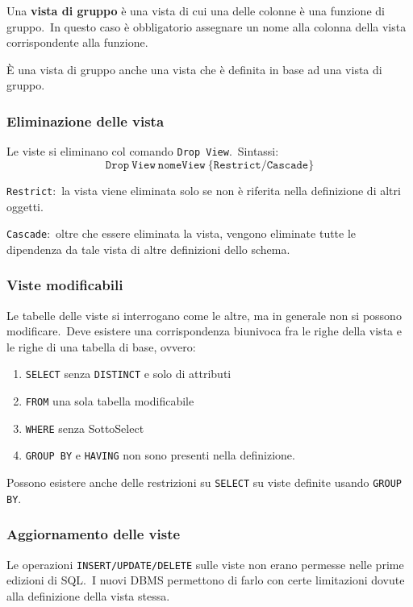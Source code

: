 Una \textbf{vista di gruppo} è una vista di cui una delle colonne è una funzione di gruppo.\
In questo caso è obbligatorio assegnare un nome alla colonna della vista corrispondente alla funzione.\

È una vista di gruppo anche una vista che è definita in base ad una vista di gruppo.

\subsubsection{Eliminazione delle vista}

Le viste si eliminano col comando \texttt{Drop View}.\
Sintassi:
\[\mathtt{Drop\ View\ nomeView\ \{Restrict/Cascade\}}\]

\noindent\texttt{Restrict}:\ la vista viene eliminata solo se non è riferita nella definizione di altri oggetti.

\noindent\texttt{Cascade}:\ oltre che essere eliminata la vista, vengono eliminate tutte le dipendenza da tale vista di altre definizioni dello schema.

\subsubsection{Viste modificabili}

Le tabelle delle viste si interrogano come le altre, ma in generale non  si possono modificare.\
Deve esistere una corrispondenza biunivoca fra le righe della vista e le righe di una tabella di base, ovvero:

\begin{enumerate}
	\item \texttt{SELECT} senza \texttt{DISTINCT} e solo di attributi
	\item \texttt{FROM} una sola tabella modificabile
	\item \texttt{WHERE} senza SottoSelect
	\item \texttt{GROUP BY} e \texttt{HAVING} non sono presenti nella definizione.
\end{enumerate}
Possono esistere anche delle restrizioni su \texttt{SELECT} su viste definite usando \texttt{GROUP BY}.

\subsubsection{Aggiornamento delle viste}

Le operazioni \texttt{INSERT/UPDATE/DELETE} sulle viste non erano permesse nelle prime edizioni di SQL.\
I nuovi DBMS permettono di farlo con certe limita\-zioni dovute alla definizione della vista stessa.

